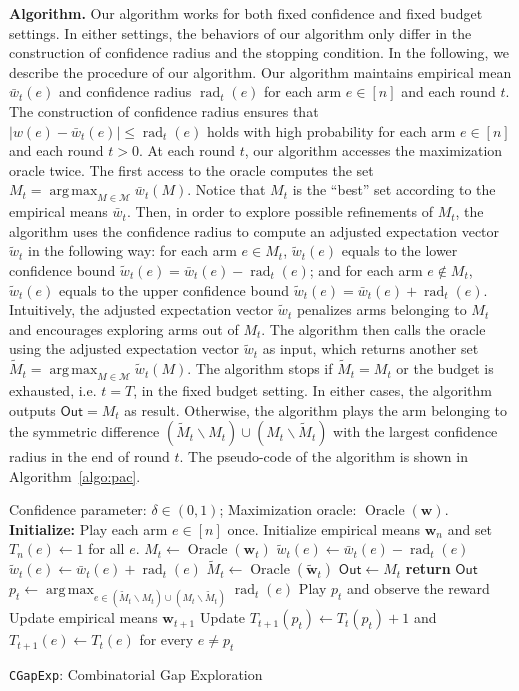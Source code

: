 \documentclass{article}
\newcommand{\Algorithm}{\texttt{CGapExp}\xspace}
\newcommand{\M}{\mathcal M}
\newcommand{\del}{\backslash}
\DeclareMathOperator{\rad}{rad}
\DeclareMathOperator*{\argmax}{arg\,max}
\DeclareMathOperator{\Oracle}{Oracle}
\newcommand{\out}{\mathsf{Out}}
\renewcommand{\vec}[1]{\boldsymbol{#1}}
\begin{document}
\begin{spacing}{1.1}
\textbf{Algorithm.} 
Our algorithm works for both fixed confidence and fixed budget settings.
In either settings, the behaviors of our algorithm only differ in the construction of confidence radius and the stopping condition.
In the following, we describe the procedure of our algorithm.
Our algorithm maintains empirical mean $\bar w_t(e)$ and confidence radius $\rad_t(e)$ for each arm $e\in[n]$ and each round $t$.
The construction of confidence radius ensures that $|w(e)-\bar w_t(e)| \le \rad_t(e)$ holds with high probability for each arm $e \in [n]$ and each round $t>0$.
At each round $t$, our algorithm accesses the maximization oracle twice. 
The first access to the oracle computes the set $M_t=\argmax_{M\in \M} \bar w_t(M)$.
Notice that $M_t$ is the ``best'' set according to the empirical means $\bar w_t$.
Then, in order to explore possible refinements of $M_t$, the algorithm uses the confidence radius to compute an adjusted expectation vector $\tilde w_t$ in the following way: for each arm $e \in M_t$, $\tilde w_t(e)$ equals to the lower confidence bound $\tilde w_t(e) = \bar w_t(e)-\rad_t(e)$; and for each arm $e\not\in M_t$, $\tilde w_t(e)$ equals to the upper confidence bound $\tilde w_t(e)=\bar w_t(e)+\rad_t(e)$.
Intuitively, the adjusted expectation vector $\tilde w_t$ penalizes arms belonging to $M_t$ and encourages exploring arms out of $M_t$.
The algorithm then calls the oracle using the adjusted expectation vector $\tilde w_t$ as input, which returns another set $\tilde M_t = \argmax_{M\in \M} \tilde w_t(M)$.
The algorithm stops if $\tilde M_t= M_t$ or the budget is exhausted, i.e. $t=T$, in the fixed budget setting.
In either cases, the algorithm outputs $\out=M_t$ as result.
Otherwise, the algorithm plays the arm belonging to the symmetric difference $(\tilde M_t \del M_t) \cup (M_t \del \tilde M_t)$ with the largest confidence radius in the end of round $t$.
The pseudo-code of the algorithm is shown in Algorithm~\ref{algo:pac}. 

\begin{algorithm}[htbp]
\begin{algorithmic}[1]
\Require Confidence parameter: $\delta \in (0,1)$; Maximization oracle: $\Oracle(\vec w)$.
\Statex \textbf{Initialize:} Play each arm $e \in [n]$ once. Initialize empirical means $\vec w_n$ and set $T_{n}(e) \gets 1$ for all $e$.
	\State $M_t \gets \Oracle(\vec w_t)$
			\State $\tilde w_t(e) \gets \bar w_t(e)-\rad_t(e)$
		\Else
			\State $\tilde w_t(e) \gets \bar w_t(e)+\rad_t(e)$
		\EndIf
	\EndFor
	\State $\tilde M_t \gets \Oracle(\vec{\tilde w}_t)$
		\State $\out \gets M_t$
		\State \textbf{return} $\out$
	\EndIf
	\State $p_t \gets \argmax_{e\in (\tilde M_t \del M_t) \cup (M_t \del \tilde M_t)} \rad_t(e)$\label{algo:step:D}
	\State Play $p_t$ and observe the reward
	\State Update empirical means $\vec w_{t+1}$
	\State Update $T_{t+1}(p_t)\gets T_{t}(p_t)+1$ and $T_{t+1}(e) \gets T_{t}(e)$ for every $e\not=p_t$
	\EndFor
\end{algorithmic}
\caption{\Algorithm: Combinatorial Gap Exploration}
\label{algo:pac}
\end{algorithm}



\end{spacing}
\end{document}
